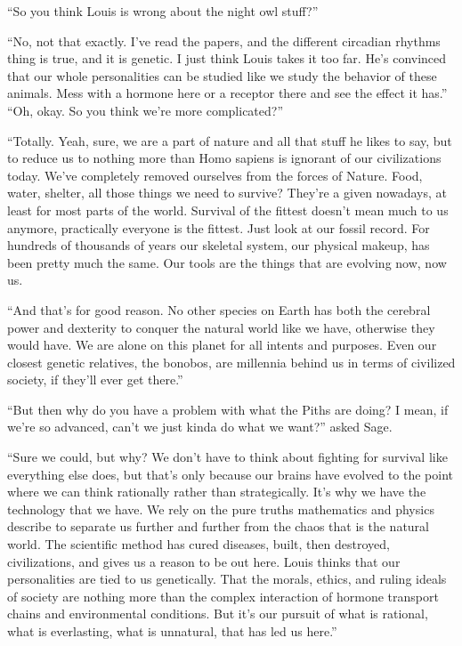 \documentclass[12pt, fleqn, AofM.tex]{subfiles}
\begin{document}
“So you think Louis is wrong about the night owl stuff?”

“No, not that exactly. I've read the papers, and the different circadian rhythms thing is true, and it is genetic. I just think Louis takes it too far. He's convinced that our whole personalities can be studied like we study the behavior of these animals. Mess with a hormone here or a receptor there and see the effect it has.”
“Oh, okay. So you think we're more complicated?”

“Totally. Yeah, sure, we are a part of nature and all that stuff he likes to say, but to reduce us to nothing more than Homo sapiens is ignorant of our civilizations today. We've completely removed ourselves from the forces of Nature. Food, water, shelter, all those things we need to survive? They're a given nowadays, at least for most parts of the world. Survival of the fittest doesn't mean much to us anymore, practically everyone is the fittest. Just look at our fossil record. For hundreds of thousands of years our skeletal system, our physical makeup, has been pretty much the same. Our tools are the things that are evolving now, now us.

“And that's for good reason. No other species on Earth has both the cerebral power and dexterity to conquer the natural world like we have, otherwise they would have. We are alone on this planet for all intents and purposes. Even our closest genetic relatives, the bonobos, are millennia behind us in terms of civilized society, if they'll ever get there.”

“But then why do you have a problem with what the Piths are doing? I mean, if we're so advanced, can't we just kinda do what we want?” asked Sage. 

“Sure we could, but why? We don't have to think about fighting for survival like everything else does, but that's only because our brains have evolved to the point where we can think rationally rather than strategically. It's why we have the technology that we have. We rely on the pure truths mathematics and physics describe to separate us further and further from the chaos that is the natural world. The scientific method has cured diseases, built, then destroyed, civilizations, and gives us a reason to be out here. Louis thinks that our personalities are tied to us genetically. That the morals, ethics, and ruling ideals of society are nothing more than the complex interaction of hormone transport chains and environmental conditions. But it's our pursuit of what is rational, what is everlasting, what is unnatural, that has led us here.”
\end{document}
